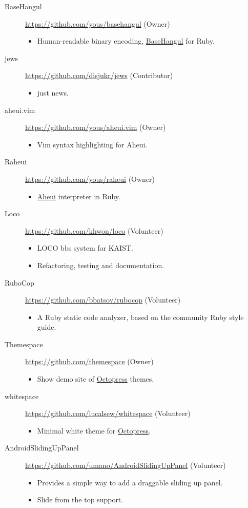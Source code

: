 \documentclass[a4paper,10pt]{article}
\begin{document}
\begin{description}
  \item[BaseHangul] \url{https://github.com/yous/basehangul} (Owner)
    \begin{itemize}
      \item Human-readable binary encoding, \href{https://basehangul.github.io}{BaseHangul} for Ruby.
    \end{itemize}
  \item[jews] \url{https://github.com/disjukr/jews} (Contributor)
    \begin{itemize}
      \item just news.
    \end{itemize}
  \item[aheui.vim] \url{https://github.com/yous/aheui.vim} (Owner)
    \begin{itemize}
      \item Vim syntax highlighting for Aheui.
    \end{itemize}
  \item[Raheui] \url{https://github.com/yous/raheui} (Owner)
    \begin{itemize}
      \item \href{http://aheui.github.io}{Aheui} interpreter in Ruby.
    \end{itemize}
  \item[Loco] \url{https://github.com/khwon/loco} (Volunteer)
    \begin{itemize}
      \item LOCO bbs system for KAIST.
      \item Refactoring, testing and documentation.
    \end{itemize}
  \item[RuboCop] \url{https://github.com/bbatsov/rubocop} (Volunteer)
    \begin{itemize}
      \item A Ruby static code analyzer, based on the community Ruby style guide.
    \end{itemize}
  \item[Themespace] \url{https://github.com/themespace} (Owner)
    \begin{itemize}
      \item Show demo site of \href{http://octopress.org}{Octopress} themes.
    \end{itemize}
  \item[whitespace] \url{https://github.com/lucalsew/whitespace} (Volunteer)
    \begin{itemize}
      \item Minimal white theme for \href{http://octopress.org}{Octopress}.
    \end{itemize}
  \item[AndroidSlidingUpPanel] \url{https://github.com/umano/AndroidSlidingUpPanel} (Volunteer)
    \begin{itemize}
      \item Provides a simple way to add a draggable sliding up panel.
      \item Slide from the top support.
    \end{itemize}
\end{description}


\end{document}
